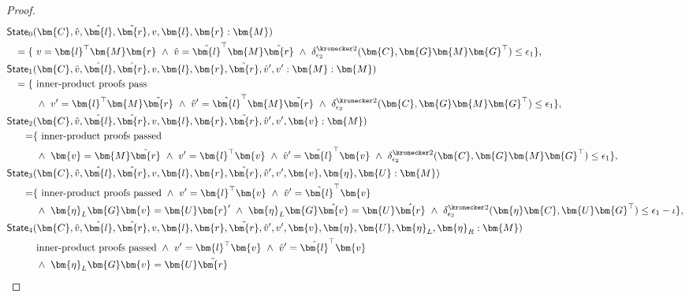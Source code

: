 \begin{proof}
{\allowdisplaybreaks
\begin{align*}
\mathsf{State}_0&
(
\bm{C}, \hat{v}, \hat{\bm{l}}, \hat{\bm{r}}, v, \bm{l}, \bm{r}: \bm{M}
)
\\
=\{&
~v = \bm{l}^\top \bm{M} \bm{r}
~\wedge~
\hat{v} = \hat{\bm{l}}^\top\bm{M} \hat{\bm{r}}
~\wedge~
\delta_{\epsilon_2}^{\kronecker 2}(\bm{C}, \bm{G}\bm{M}\bm{G}^\top) \le \epsilon_1
\},
\\
\mathsf{State}_1&
(
\bm{C}, \hat{v}, \hat{\bm{l}}, \hat{\bm{r}}, v, \bm{l}, \bm{r}, \tilde{\bm{r}},\hat{v}', v': \bm{M}
: \bm{M}
)
\\
=\{&
~\text{inner-product proofs pass}
\\
&
~\wedge~
v' = \bm{l}^\top \bm{M} \tilde{\bm{r}}
~\wedge~
\hat{v}' = \hat{\bm{l}}^\top\bm{M} \tilde{\bm{r}}
~\wedge~
\delta_{\epsilon_2}^{\kronecker 2}(\bm{C}, \bm{G}\bm{M}\bm{G}^\top) \le \epsilon_1
\},
\\
\mathsf{State}_2&
(
\bm{C}, \hat{v}, \hat{\bm{l}}, \hat{\bm{r}}, v, \bm{l}, \bm{r}, \tilde{\bm{r}},\hat{v}', v', \bm{v}: \bm{M}
)
\\
=&\{
~\text{inner-product proofs passed}
\\
&
~\wedge~
\bm{v} = \bm{M}\tilde{\bm{r}}
~\wedge~
v' = \bm{l}^\top \bm{v}
~\wedge~
\hat{v}' = \hat{\bm{l}}^\top\bm{v} 
~\wedge~
\delta_{\epsilon_2}^{\kronecker 2}(\bm{C}, \bm{G}\bm{M}\bm{G}^\top) \le \epsilon_1
\},
\\
\mathsf{State}_3&
(
\bm{C}, \hat{v}, \hat{\bm{l}}, \hat{\bm{r}}, v, \bm{l}, \bm{r}, \tilde{\bm{r}},\hat{v}', v', \bm{v}, \bm{\eta}, \bm{U}
: \bm{M}
)
\\
=&\{
~\text{inner-product proofs passed} ~\wedge~
v' = \bm{l}^\top \bm{v}
~\wedge~
\hat{v}' = \hat{\bm{l}}^\top\bm{v} 
\\
&
~\wedge~
\bm{\eta}_L\bm{G}\bm{v} = \bm{U}\bm{r}'
~\wedge~
\bm{\eta}_L\bm{G}\hat{\bm{v}} = \bm{U}\hat{\bm{r}}
~\wedge~
\delta_{\epsilon_2}^{\kronecker 2}(\bm{\eta}\bm{C}, \bm{U}\bm{G}^\top) \le \epsilon_1 - \iota
\},
\\
\mathsf{State}_4&
(
\bm{C}, \hat{v}, \hat{\bm{l}}, \hat{\bm{r}}, v, \bm{l}, \bm{r}, \tilde{\bm{r}},\hat{v}', v', \bm{v}, \bm{\eta}, \bm{U}, \bm{\eta}_L, \bm{\eta}_R
: \bm{M}
)
\\
&
~\text{inner-product proofs passed}
~\wedge~
v' = \bm{l}^\top \bm{v}
~\wedge~
\hat{v}' = \hat{\bm{l}}^\top\bm{v} 
\\
&
~\wedge~
\bm{\eta}_L\bm{G}\bm{v} = \bm{U}\tilde{\bm{r}}

\end{align*}}
\end{proof}
